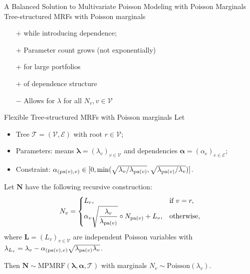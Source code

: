 \documentclass[11pt,xcolor={dvipsnames},hyperref={pdftex,pdfpagemode=UseNone,hidelinks,pdfdisplaydoctitle=true},usepdftitle=false]{beamer}
\begin{document}
\begin{frame}{A Balanced Solution to Multivariate Poisson Modeling with Poisson Marginals}
Tree-structured MRFs with Poisson marginals \citep{cote2025tree} 
\begin{itemize}
        \item[+]  while introducing dependence;
        \vfill
        \item[+] Parameter count grows  
        (not exponentially)
        \vfill
        \item[+]  for large portfolios
        \vfill
        \item[+]  of dependence structure
        \vfill
        \item[$-$] Allows for  $\lambda$ for all $N_v, v \in \mathcal{V}$ 
\end{itemize}
\end{frame}
\begin{frame}{Flexible Tree-structured MRFs with Poisson marginals}
    Let
    \begin{itemize}
            \item Tree $\mathcal{T} = (\mathcal{V}, \mathcal{E})$ with root $r \in \mathcal{V}$;
            \item Parameters: means $\boldsymbol{\lambda} = (\lambda_v)_{v \in \mathcal{V}}$ and dependencies $\boldsymbol{\alpha} = (\alpha_e)_{e \in \mathcal{E}}$;
            \item Constraint: $\alphav{v} \in [0, \min(\sqrt{{\lambda_{v}}/{\lambda_{\pa{v}}}}, \sqrt{{\lambda_{\pa{v}}}/{\lambda_{v}}})]$.
    \end{itemize}
\begin{theorem}
Let $\boldsymbol{N}$ have the following recursive construction:
        \begin{equation*}
        N_v = 
        \begin{cases}
        L_r, & \text{if } v = r, \\ 
        \alpha_v \sqrt{\dfrac{\lambda_v}{\lambda_{\mathrm{pa}(v)}}} \circ N_{\mathrm{pa}(v)} + L_v, & \text{otherwise},
        \end{cases}
        \end{equation*}
        where $\boldsymbol{L} = (L_v)_{v\in\mathcal{V}}$ are independent Poisson variables with $\lambda_{L_v} = \lambda_v- \alpha_{(\mathrm{pa}(v), v)}\sqrt{\lambda_{\mathrm{pa}(v)}\lambda_v}$.
        
        Then $\boldsymbol{N} \sim \text{MPMRF}(\boldsymbol{\lambda}, \boldsymbol{\alpha}, \mathcal{T})$ with marginals $N_v \sim \text{Poisson}(\lambda_v)$.
\end{theorem}
    

\end{frame}
\end{document}
